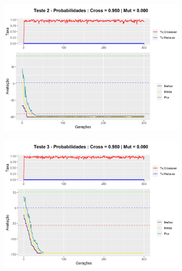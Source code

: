 \begin{figure}[ht]
	\centering
	\begin{subfigure}[b]{0.47\linewidth}
		\includegraphics[width=\linewidth]{imagens/graph_pc_0_950_pm_0_000_pop_50_g_300__2.png}
		\caption{}
	\end{subfigure}
	\begin{subfigure}[b]{0.47\linewidth}
		\includegraphics[width=\linewidth]{imagens/graph_pc_0_950_pm_0_000_pop_50_g_300__3.png}
		\caption{}
	\end{subfigure}
	\begin{subfigure}[b]{0.47\linewidth}

\end{subfigure}
\end{figure}
